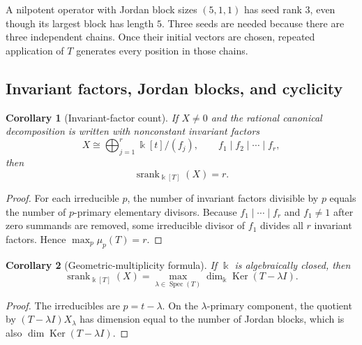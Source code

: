 \documentclass[11pt]{article}
\newtheorem{corollary}[corollary]{Corollary}
\theoremstyle{definition}
\theoremstyle{remark}
\theoremstyle{definition}\newtheorem{example}[theorem]{Example}
\newcommand{\bbk}{\Bbbk}
\newcommand{\srank}{\operatorname{srank}}
\newcommand{\Ker}{\operatorname{Ker}}
\newcommand{\RecordID}[1]{\label{record:#1}}
\newcommand{\Depends}[1]{}
\begin{document}
\begin{microexample}[title={Block count versus block size}]
A nilpotent operator with Jordan block sizes \((5,1,1)\) has seed rank \(3\), even though its largest block has length \(5\).  Three seeds are needed because there are three independent chains.  Once their initial vectors are chosen, repeated application of \(T\) generates every position in those chains.
\end{microexample}


\subsection{Invariant factors, Jordan blocks, and cyclicity}
\begin{corollary}[Invariant-factor count]
\label{cor:invariant-factor-count}
If $X\neq0$ and the rational canonical decomposition is written with nonconstant invariant factors
\[
X\cong\bigoplus_{j=1}^{r}\bbk[t]/(f_j),
\qquad
f_1\mid f_2\mid\cdots\mid f_r,
\]
then
\[
\boxed{\srank_{\bbk[T]}(X)=r.}
\]
\end{corollary}
\RecordID{PSC-I-C-INVARIANT-FACTOR-COUNT}
\Depends{PSC-I-T-SINGLE-OPERATOR.}

\begin{proof}
For each irreducible $p$, the number of invariant factors divisible by $p$ equals the number of $p$-primary elementary divisors.  Because $f_1\mid\cdots\mid f_r$ and $f_1\neq1$ after zero summands are removed, some irreducible divisor of $f_1$ divides all $r$ invariant factors.  Hence $\max_p\mu_p(T)=r$.
\end{proof}

\begin{corollary}[Geometric-multiplicity formula]
\label{cor:geometric-multiplicity}
If $\bbk$ is algebraically closed, then
\[
\boxed{
\srank_{\bbk[T]}(X)
=
\max_{\lambda\in\operatorname{Spec}(T)}
\dim_{\bbk}\Ker(T-\lambda I).
}
\]
\end{corollary}
\RecordID{PSC-I-C-ALGEBRAICALLY-CLOSED-SINGLE-OPERATOR}
\Depends{PSC-I-T-SINGLE-OPERATOR.}

\begin{proof}
The irreducibles are $p=t-\lambda$.  On the $\lambda$-primary component, the quotient by $(T-\lambda I)X_\lambda$ has dimension equal to the number of Jordan blocks, which is also $\dim\Ker(T-\lambda I)$.
\end{proof}
\end{document}

